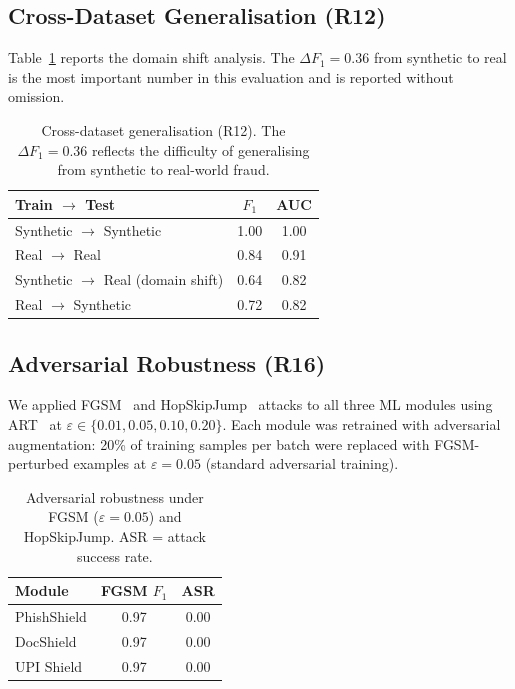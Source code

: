 \documentclass[conference]{IEEEtran}
\begin{document}
\subsection{Cross-Dataset Generalisation (R12)}
\vspace{2mm}
Table~\ref{tab:generalization} reports the domain shift analysis.
The $\Delta F_1{=}0.36$ from synthetic to real is the most important
number in this evaluation and is reported without omission.

\begin{table}[t]
\centering
\caption{Cross-dataset generalisation (R12). The $\Delta F_1{=}0.36$
reflects the difficulty of generalising from synthetic to real-world
fraud.}
\label{tab:generalization}
\begin{tabular}{lcc}
\toprule
\textbf{Train} $\to$ \textbf{Test} & \textbf{$F_1$} & \textbf{AUC} \\
\midrule
Synthetic $\to$ Synthetic            & 1.00 & 1.00 \\
Real $\to$ Real                      & 0.84 & 0.91 \\
Synthetic $\to$ Real (domain shift)  & 0.64 & 0.82 \\
Real $\to$ Synthetic                 & 0.72 & 0.82 \\
\bottomrule
\end{tabular}
\end{table}

\subsection{Adversarial Robustness (R16)}
\vspace{2mm}
We applied FGSM~\cite{goodfellow2015} and
HopSkipJump~\cite{chen2020} attacks to all three ML modules using
ART~\cite{nicolae2018} at
$\varepsilon\!\in\!\{0.01,0.05,0.10,0.20\}$. Each module was
retrained with adversarial augmentation: 20\% of training samples per
batch were replaced with FGSM-perturbed examples at
$\varepsilon{=}0.05$ (standard adversarial training).

\begin{table}[t]
\centering
\caption{Adversarial robustness under FGSM ($\varepsilon{=}0.05$)
and HopSkipJump. ASR = attack success rate.}
\label{tab:adversarial}
\begin{tabular}{lcc}
\toprule
\textbf{Module} & \textbf{FGSM $F_1$} & \textbf{ASR} \\
\midrule
PhishShield & 0.97 & 0.00 \\
DocShield   & 0.97 & 0.00 \\
UPI Shield  & 0.97 & 0.00 \\
\bottomrule
\end{tabular}
\end{table}
\end{document}
